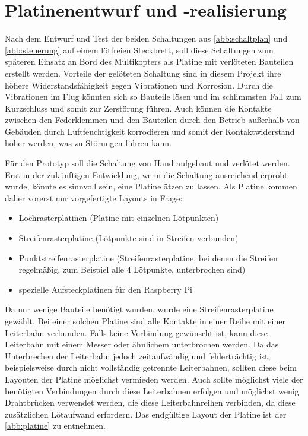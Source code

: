 \documentclass[a4paper,12pt,bibliography=totoc, listof=totoc,titlepage,pointlessnumbers]{scrreprt}
\begin{document}
\section{Platinenentwurf und -realisierung}
Nach dem Entwurf und Test der beiden Schaltungen aus \autoref{abb:schaltplan} und \autoref{abb:steuerung} auf einem lötfreien Steckbrett, soll diese Schaltungen zum späteren Einsatz an Bord des Multikopters als Platine mit verlöteten Bauteilen erstellt werden. Vorteile der gelöteten Schaltung sind in diesem Projekt ihre höhere Widerstandsfähigkeit gegen Vibrationen und Korrosion. Durch die Vibrationen im Flug könnten sich so Bauteile lösen und im schlimmsten Fall zum Kurzschluss und somit zur Zerstörung führen. Auch können die Kontakte zwischen den Federklemmen und den Bauteilen durch den Betrieb außerhalb von Gebäuden durch Luftfeuchtigkeit korrodieren und somit der Kontaktwiderstand höher werden, was zu Störungen führen kann.

Für den Prototyp soll die Schaltung von Hand aufgebaut und verlötet werden. Erst in der zukünftigen Entwicklung, wenn die Schaltung ausreichend erprobt wurde, könnte es sinnvoll sein, eine Platine ätzen zu lassen. Als Platine kommen daher vorerst nur vorgefertigte Layouts in Frage:

\begin{itemize}
 \item Lochrasterplatinen (Platine mit einzelnen Lötpunkten)
 \item Streifenrasterplatine (Lötpunkte sind in Streifen verbunden)
 \item Punktstreifenrasterplatine (Streifenrasterplatine, bei denen die Streifen regelmäßig, zum Beispiel alle 4 Lötpunkte, unterbrochen sind)
 \item spezielle Aufsteckplatinen für den Raspberry Pi
\end{itemize}

Da nur wenige Bauteile benötigt wurden, wurde eine Streifenrasterplatine gewählt. Bei einer solchen Platine sind alle Kontakte in einer Reihe mit einer Leiterbahn verbunden. Falls keine Verbindung gewünscht ist, kann diese Leiterbahn mit einem Messer oder ähnlichem unterbrochen werden. Da das Unterbrechen der Leiterbahn jedoch zeitaufwändig und fehlerträchtig ist, beispielsweise durch nicht vollständig getrennte Leiterbahnen, sollten diese beim Layouten der Platine möglichst vermieden werden. Auch sollte möglichst viele der benötigten Verbindungen durch diese Leiterbahnen erfolgen und möglichst wenig Drahtbrücken verwendet werden, die diese Leiterbahnreihen verbinden, da diese zusätzlichen Lötaufwand erfordern. Das endgültige Layout der Platine ist der \autoref{abb:platine} zu entnehmen.
\end{document}
